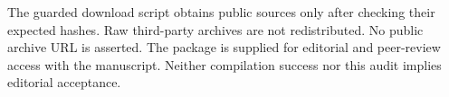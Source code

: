 \documentclass[smallextended]{svjour3}
\begin{document}
The guarded download script obtains public sources only after checking their
expected hashes. Raw third-party archives are not redistributed. No public
archive URL is asserted. The package is supplied for editorial and peer-review
access with the manuscript. Neither compilation success nor this audit implies
editorial acceptance.
\end{document}
